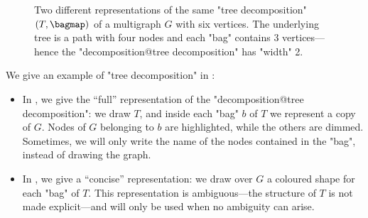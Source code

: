 \begin{figure}
	\centering
	\hfill
	\caption{
		\AP\label{fig:ex-tree-dec}
		Two different representations of the same "tree decomposition" $(T, \bagmap)$ of a 
		multigraph $G$ with six 
		vertices. The underlying tree is a path with four nodes and each "bag" contains 3 
		vertices---hence the "decomposition@tree decomposition" has "width" 2.
	}
\end{figure}
We give an example of "tree decomposition" in :
\begin{itemize}
	\item In , we give the ``full'' representation of
	the "decomposition@tree decomposition": we draw $T$, and inside each "bag" $b$ of $T$
	we represent a copy of $G$. Nodes of $G$ belonging to $b$ are highlighted, while the others are dimmed. Sometimes, we will only write the
	name of the nodes contained in the "bag", instead of drawing the graph.
	\item In , we give a ``concise'' representation:
	we draw over $G$ a coloured shape for each "bag" of $T$. This representation is ambiguous---the structure of $T$ is not made explicit---and will only be used when no ambiguity can arise.
\end{itemize}

